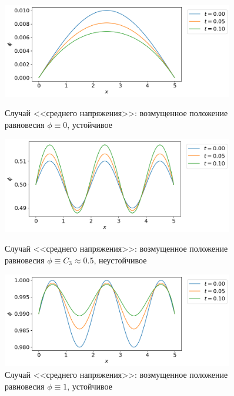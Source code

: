 \begin{figure}[!tp]
	\centering
	\includegraphics[width=0.9\textwidth]{figures/equilibrium_2_0.png}
	\vspace{-0.3cm}
	\caption{Случай <<среднего напряжения>>: возмущенное положение равновесия $\phi \equiv 0$, устойчивое}
	\label{fig:equilibrium_2_0}
	\vspace{0.5cm}

	\includegraphics[width=0.9\textwidth]{figures/equilibrium_2_05.png}
	\vspace{-0.3cm}
	\caption{Случай <<среднего напряжения>>: возмущенное положение равновесия $\phi \equiv C_3 \approx 0.5$, неустойчивое}
	\label{fig:equilibrium_2_05}
	\vspace{0.5cm}
	
	\includegraphics[width=0.9\textwidth]{figures/equilibrium_2_1.png}
	\vspace{-0.3cm}
	\caption{Случай <<среднего напряжения>>: возмущенное положение равновесия $\phi \equiv 1$, устойчивое}
	\label{fig:equilibrium_2_1}
\end{figure}

